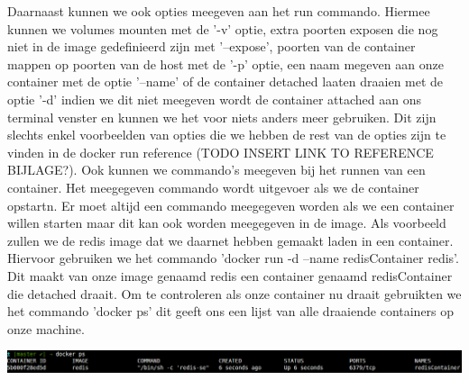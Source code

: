 Daarnaast kunnen we ook opties meegeven aan het run commando. Hiermee kunnen we volumes mounten met de '-v' optie, extra poorten exposen die nog niet in de image gedefinieerd zijn met '--expose', poorten van de container mappen op poorten van de host met de '-p' optie, een naam megeven aan onze container met de optie '--name'  of de container detached laaten draaien met de optie '-d' indien we dit niet meegeven wordt de container attached aan ons terminal venster en kunnen we het voor niets anders meer gebruiken. Dit zijn slechts enkel voorbeelden van opties die we hebben de rest van de opties zijn te vinden in de docker run reference (TODO INSERT LINK TO REFERENCE BIJLAGE?). Ook kunnen we commando's meegeven bij het runnen van een container. Het meegegeven commando wordt uitgevoer als we de container opstartn. Er moet altijd een commando meegegeven worden als we een container willen starten maar dit kan ook worden meegegeven in de image. Als voorbeeld zullen we de redis image dat we daarnet hebben gemaakt laden in een container. Hiervoor gebruiken we het commando 'docker run -d --name redisContainer redis'. Dit maakt van onze image genaamd redis een container genaamd redisContainer die detached draait. Om te controleren als onze container nu draait gebruikten we het commando 'docker ps' dit geeft ons een lijst van alle draaiende containers op onze machine. 
 
\includegraphics[scale=0.35]{img/dockerps.png}